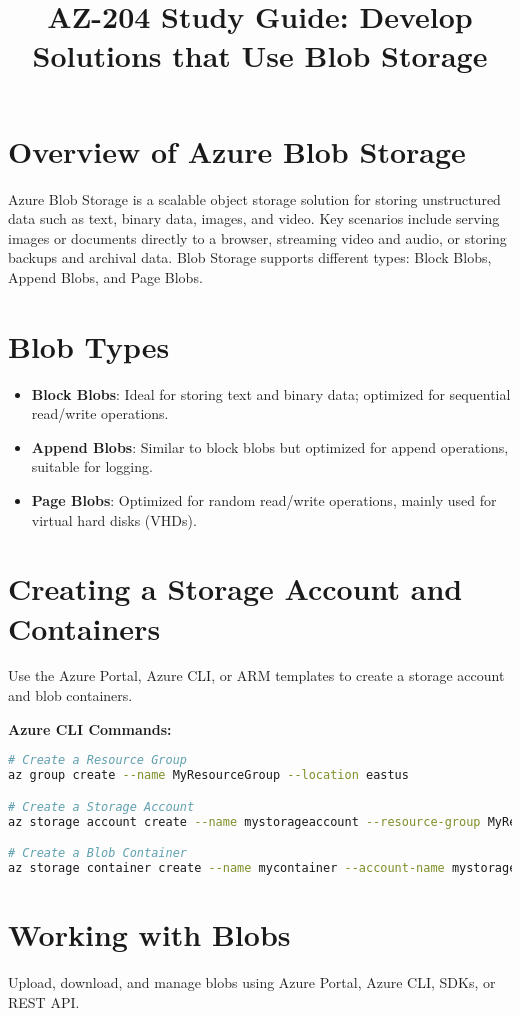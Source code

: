 \documentclass{article}
\title{AZ-204 Study Guide: Develop Solutions that Use Blob Storage}
\author{}
\date{}
\begin{document}
\maketitle

\section{Overview of Azure Blob Storage}
Azure Blob Storage is a scalable object storage solution for storing unstructured data such as text, binary data, images, and video. Key scenarios include serving images or documents directly to a browser, streaming video and audio, or storing backups and archival data. Blob Storage supports different types: Block Blobs, Append Blobs, and Page Blobs.

\section{Blob Types}
\begin{itemize}
    \item \textbf{Block Blobs}: Ideal for storing text and binary data; optimized for sequential read/write operations.
    \item \textbf{Append Blobs}: Similar to block blobs but optimized for append operations, suitable for logging.
    \item \textbf{Page Blobs}: Optimized for random read/write operations, mainly used for virtual hard disks (VHDs).
\end{itemize}

\section{Creating a Storage Account and Containers}
Use the Azure Portal, Azure CLI, or ARM templates to create a storage account and blob containers.

\textbf{Azure CLI Commands:}
\begin{lstlisting}[language=bash]
# Create a Resource Group
az group create --name MyResourceGroup --location eastus

# Create a Storage Account
az storage account create --name mystorageaccount --resource-group MyResourceGroup --location eastus --sku Standard_LRS

# Create a Blob Container
az storage container create --name mycontainer --account-name mystorageaccount
\end{lstlisting}

\section{Working with Blobs}
Upload, download, and manage blobs using Azure Portal, Azure CLI, SDKs, or REST API.
\end{document}
